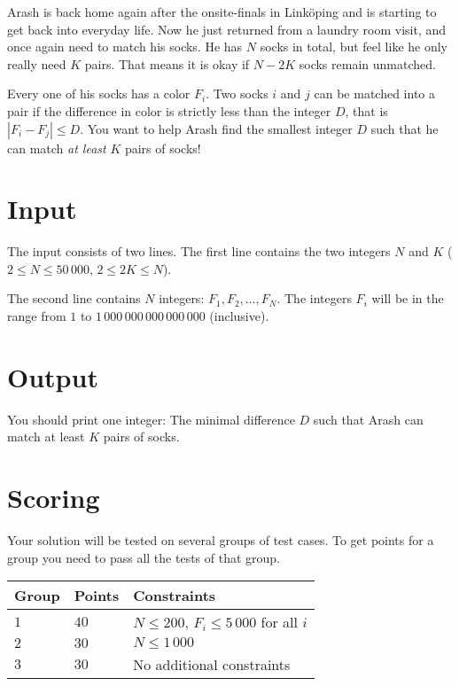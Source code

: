 Arash is back home again after the onsite-finals in Linköping and is starting to get back into everyday life.
Now he just returned from a laundry room visit, and once again need to match his socks.
He has $N$ socks in total, but feel like he only really need $K$ pairs.
That means it is okay if $N-2K$ socks remain unmatched.

Every one of his socks has a color $F_i$. Two socks $i$ and $j$ can be matched into a pair
if the difference in color is strictly less than the integer $D$, that is $|F_i - F_j| \le D$.
You want to help Arash find the smallest integer $D$ such that he can match \textit{at least} $K$ pairs of socks!

\section*{Input}

The input consists of two lines.
The first line contains the two integers $N$ and $K$ ($2 \leq N \leq 50\,000$, $2 \leq 2K \leq N$).

The second line contains $N$ integers: $F_1, F_2, \dots, F_N$. The integers $F_i$ will be in the range from $1$
to $1\,000\,000\,000\,000\,000$ (inclusive).

\section*{Output}

You should print one integer: The minimal difference $D$ such that Arash can match at least $K$ pairs of socks.


\section*{Scoring}
Your solution will be tested on several groups of test cases. To get points for a group you need to pass all the tests of that group.

\noindent
\begin{tabular}{| l | l | l |}
	\hline
	Group & Points & Constraints\\ \hline
 $1$    & $40$        & $N \leq 200$, $F_i \leq 5\,000$ for all $i$ \\ \hline
 $2$    & $30$        & $N \leq 1\,000$ \\ \hline
 $3$    & $30$        & No additional constraints \\ \hline
\end{tabular}
